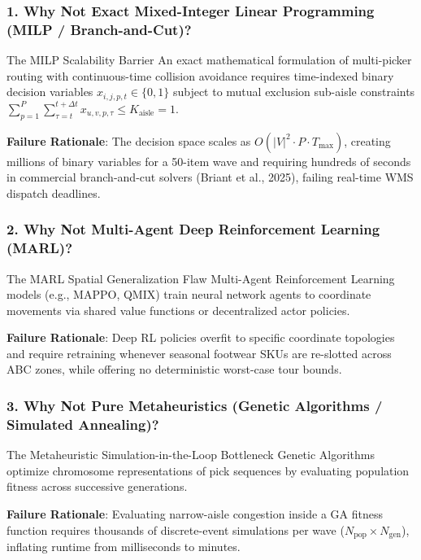 \documentclass[11pt,a4paper]{article}
\begin{document}
\subsubsection{1. Why Not Exact Mixed-Integer Linear Programming (MILP / Branch-and-Cut)?}
\begin{rationalebox}{The MILP Scalability Barrier}
An exact mathematical formulation of multi-picker routing with continuous-time collision avoidance requires time-indexed binary decision variables $x_{i, j, p, t} \in \{0, 1\}$ subject to mutual exclusion sub-aisle constraints $\sum_{p=1}^P \sum_{\tau = t}^{t + \Delta t} x_{u, v, p, \tau} \le K_{\text{aisle}} = 1$.
\end{rationalebox}
\textbf{Failure Rationale}: The decision space scales as $O(|V|^2 \cdot P \cdot T_{\max})$, creating millions of binary variables for a 50-item wave and requiring hundreds of seconds in commercial branch-and-cut solvers (Briant et al., 2025), failing real-time WMS dispatch deadlines.

\subsubsection{2. Why Not Multi-Agent Deep Reinforcement Learning (MARL)?}
\begin{rationalebox}{The MARL Spatial Generalization Flaw}
Multi-Agent Reinforcement Learning models (e.g., MAPPO, QMIX) train neural network agents to coordinate movements via shared value functions or decentralized actor policies.
\end{rationalebox}
\textbf{Failure Rationale}: Deep RL policies overfit to specific coordinate topologies and require retraining whenever seasonal footwear SKUs are re-slotted across ABC zones, while offering no deterministic worst-case tour bounds.

\subsubsection{3. Why Not Pure Metaheuristics (Genetic Algorithms / Simulated Annealing)?}
\begin{rationalebox}{The Metaheuristic Simulation-in-the-Loop Bottleneck}
Genetic Algorithms optimize chromosome representations of pick sequences by evaluating population fitness across successive generations.
\end{rationalebox}
\textbf{Failure Rationale}: Evaluating narrow-aisle congestion inside a GA fitness function requires thousands of discrete-event simulations per wave ($N_{\text{pop}} \times N_{\text{gen}}$), inflating runtime from milliseconds to minutes.
\end{document}
